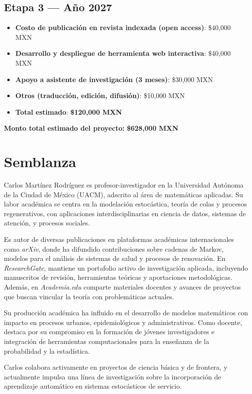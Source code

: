 \documentclass[12pt]{article}
\begin{document}
\subsection*{Etapa 3 — Año 2027}
\begin{itemize}
  \item \textbf{Costo de publicación en revista indexada (open access)}: \$40,000 MXN
  \item \textbf{Desarrollo y despliegue de herramienta web interactiva}: \$40,000 MXN
  \item \textbf{Apoyo a asistente de investigación (3 meses)}: \$30,000 MXN
  \item \textbf{Otros (traducción, edición, difusión)}: \$10,000 MXN
  \item \textbf{Total estimado}: \textbf{\$120,000 MXN}
\end{itemize}

\textbf{Monto total estimado del proyecto:} \textbf{\$628,000 MXN}

\section{Semblanza}
Carlos Martínez Rodríguez es profesor-investigador en la Universidad Autónoma de la Ciudad de México (UACM), adscrito al área de matemáticas aplicadas. Su labor académica se centra en la modelación estocástica, teoría de colas y procesos regenerativos, con aplicaciones interdisciplinarias en ciencia de datos, sistemas de atención, y procesos sociales.

Es autor de diversas publicaciones en plataformas académicas internacionales como \textit{arXiv}, donde ha difundido contribuciones sobre cadenas de Markov, modelos para el análisis de sistemas de salud y procesos de renovación. En \textit{ResearchGate}, mantiene un portafolio activo de investigación aplicada, incluyendo manuscritos de revisión, herramientas teóricas y aportaciones metodológicas. Además, en \textit{Academia.edu} comparte materiales docentes y avances de proyectos que buscan vincular la teoría con problemáticas actuales.

Su producción académica ha influido en el desarrollo de modelos matemáticos con impacto en procesos urbanos, epidemiológicos y administrativos. Como docente, destaca por su compromiso en la formación de jóvenes investigadores e integración de herramientas computacionales para la enseñanza de la probabilidad y la estadística.

Carlos colabora activamente en proyectos de ciencia básica y de frontera, y actualmente impulsa una línea de investigación sobre la incorporación de aprendizaje automático en sistemas estocásticos de servicio.
\end{document}
